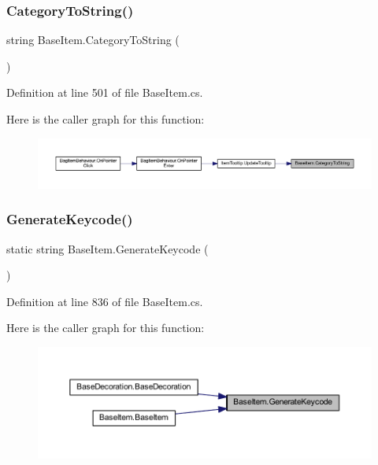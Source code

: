 \subsubsection{\texorpdfstring{CategoryToString()}{CategoryToString()}}
{\footnotesize\ttfamily string Base\+Item.\+Category\+To\+String (\begin{DoxyParamCaption}{ }\end{DoxyParamCaption})}



Definition at line 501 of file Base\+Item.\+cs.

Here is the caller graph for this function\+:
\nopagebreak
\begin{figure}[H]
\begin{center}
\leavevmode
\includegraphics[width=350pt]{class_base_item_ad820521a001d82fc3f52b2483226efde_icgraph}
\end{center}
\end{figure}
\mbox{\label{class_base_item_aa3a6bc4a2af6c424898277764e9c0585}} 
\subsubsection{\texorpdfstring{GenerateKeycode()}{GenerateKeycode()}}
{\footnotesize\ttfamily static string Base\+Item.\+Generate\+Keycode (\begin{DoxyParamCaption}{ }\end{DoxyParamCaption})\hspace{0.3cm}{\ttfamily [static]}}



Definition at line 836 of file Base\+Item.\+cs.

Here is the caller graph for this function\+:
\nopagebreak
\begin{figure}[H]
\begin{center}
\leavevmode
\includegraphics[width=350pt]{class_base_item_aa3a6bc4a2af6c424898277764e9c0585_icgraph}
\end{center}
\end{figure}
\mbox{\label{class_base_item_a0bb5888f3371b291645137272f417b30}} 
